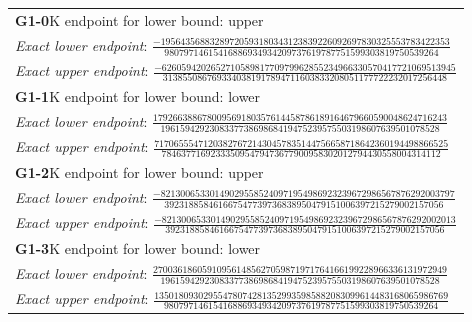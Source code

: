 {{
\normalsize
\renewcommand{\arraystretch}{1.14}
\begin{longtable}{@{}p{\textwidth}@{}}
\toprule
\textbf{G1-0}\quad K endpoint for lower bound: upper \\
\emph{Exact lower endpoint}: $\frac{-19564356883289720593180343123839226092697830325553783422353}{98079714615416886934934209737619787751599303819750539264}$ \\
\emph{Exact upper endpoint}: $\frac{-626059420265271058981770979962855234966330570417721069513945}{3138550867693340381917894711603833208051177722232017256448}$ \\
\midrule
\textbf{G1-1}\quad K endpoint for lower bound: lower \\
\emph{Exact lower endpoint}: $\frac{179266388678009569180357614458786189164679660590048624716243}{196159429230833773869868419475239575503198607639501078528}$ \\
\emph{Exact upper endpoint}: $\frac{717065554712038276721430457835144756658718642360194498866525}{784637716923335095479473677900958302012794430558004314112}$ \\
\midrule
\textbf{G1-2}\quad K endpoint for lower bound: upper \\
\emph{Exact lower endpoint}: $\frac{-821300653301490295585240971954986923239672986567876292003797}{392318858461667547739736838950479151006397215279002157056}$ \\
\emph{Exact upper endpoint}: $\frac{-821300653301490295585240971954986923239672986567876292002013}{392318858461667547739736838950479151006397215279002157056}$ \\
\midrule
\textbf{G1-3}\quad K endpoint for lower bound: lower \\
\emph{Exact lower endpoint}: $\frac{270036186059109561485627059871971764166199228966336131972949}{196159429230833773869868419475239575503198607639501078528}$ \\
\emph{Exact upper endpoint}: $\frac{135018093029554780742813529935985882083099614483168065986769}{98079714615416886934934209737619787751599303819750539264}$ \\
\bottomrule
\end{longtable}
}

}
